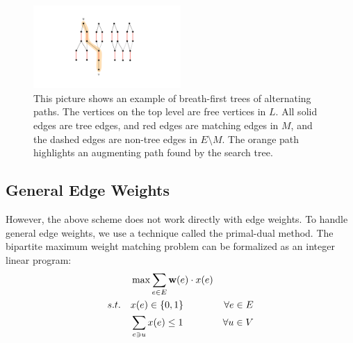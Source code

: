 \begin{figure}
	\centering
	\includegraphics[width=0.5\textwidth]{fig/lecture_matching_bipartite}
	\caption{This picture shows an example of breath-first trees of alternating paths. The vertices on the top level are free vertices in $L$. All solid edges are tree edges, and red edges are matching edges in $M$, and the dashed edges are non-tree edges in $E\setminus M$. The orange path highlights an augmenting path found by the search tree.}
	\label{fig:bipartite}
\end{figure}


\subsection{General Edge Weights}
However, the above scheme does not work directly with edge weights. To handle general edge weights, we use a technique called the primal-dual method. The bipartite maximum weight matching problem can be formalized as an integer linear program: %
$$\begin{aligned}
	&\max \sum_{e\in E}\mathbf{w}(e)\cdot x(e)\\
	s.t.\quad & x(e)\in \{0, 1\}	&	\forall e\in E\\
	& \sum_{e\ni u}x(e) \leq 1	&	\forall u\in V
\end{aligned}$$

